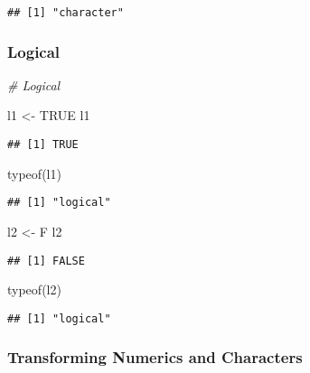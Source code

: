 \documentclass[
]{article}
\newenvironment{Shaded}{\begin{snugshade}}{\end{snugshade}}
\newcommand{\CommentTok}[1]{\textcolor[rgb]{0.56,0.35,0.01}{\textit{#1}}}
\newcommand{\ConstantTok}[1]{\textcolor[rgb]{0.00,0.00,0.00}{#1}}
\newcommand{\FunctionTok}[1]{\textcolor[rgb]{0.00,0.00,0.00}{#1}}
\newcommand{\NormalTok}[1]{#1}
\newcommand{\OtherTok}[1]{\textcolor[rgb]{0.56,0.35,0.01}{#1}}
\begin{document}
\begin{verbatim}
## [1] "character"
\end{verbatim}

\hypertarget{logical}{%
\subsubsection{Logical}\label{logical}}

\begin{Shaded}
\begin{Highlighting}[]
\CommentTok{\# Logical}

\NormalTok{l1 }\OtherTok{\textless{}{-}} \ConstantTok{TRUE}
\NormalTok{l1}
\end{Highlighting}
\end{Shaded}

\begin{verbatim}
## [1] TRUE
\end{verbatim}

\begin{Shaded}
\begin{Highlighting}[]
\FunctionTok{typeof}\NormalTok{(l1)}
\end{Highlighting}
\end{Shaded}

\begin{verbatim}
## [1] "logical"
\end{verbatim}

\begin{Shaded}
\begin{Highlighting}[]
\NormalTok{l2 }\OtherTok{\textless{}{-}}\NormalTok{ F}
\NormalTok{l2}
\end{Highlighting}
\end{Shaded}

\begin{verbatim}
## [1] FALSE
\end{verbatim}

\begin{Shaded}
\begin{Highlighting}[]
\FunctionTok{typeof}\NormalTok{(l2)}
\end{Highlighting}
\end{Shaded}

\begin{verbatim}
## [1] "logical"
\end{verbatim}

\hypertarget{transforming-numerics-and-characters}{%
\subsubsection{Transforming Numerics and
Characters}\label{transforming-numerics-and-characters}}
\end{document}
